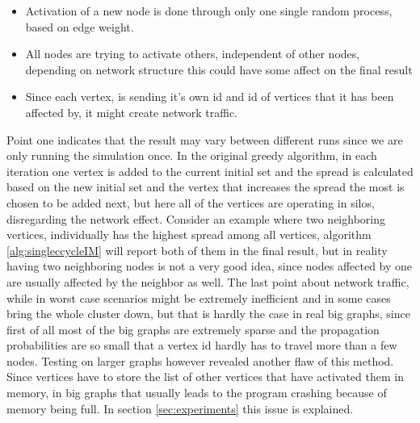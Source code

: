 \documentclass[english]{tktltiki}
\begin{document}
\begin{itemize}
\item Activation of a new node is done through only one single random process, based on edge weight.
\item All nodes are trying to activate others, independent of other nodes, depending on network structure this could have some affect on the final result
\item Since each vertex, is sending it's own id and id of vertices that it has been affected by, it might create network traffic.
\end{itemize}

Point one indicates that the result may vary between different runs since we are only running the simulation once. In the original greedy algorithm, in each iteration one vertex is added to the current initial set and the spread is calculated based on the new initial set and the vertex that increases the spread the most is chosen to be added next, but here all of the vertices are operating in silos, disregarding the network effect. Consider an example where two neighboring vertices, individually has the highest spread among all vertices, algorithm \ref{alg:singleccycleIM} will report both of them in the final result, but in reality having two neighboring nodes is not a very good idea, since nodes affected by one are usually affected by the neighbor as well. The last point about network traffic, while in worst case scenarios might be extremely inefficient and in some cases bring the whole cluster down, but that is hardly the case in real big graphs, since first of all most of the big graphs are extremely sparse and the propagation probabilities are so small that a vertex id hardly has to travel more than a few nodes. Testing on larger graphs however revealed another flaw of this method. Since vertices have to store the list of other vertices that have activated them in memory, in big graphs that usually leads to the program crashing because of memory being full. In section \ref{sec:experiments} this issue is explained.
\end{document}

